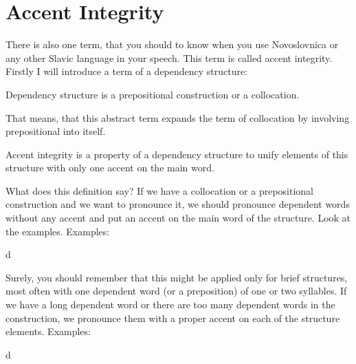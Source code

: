 \section{Accent Integrity}

There is also one term, that you should to know when you use Novoslovnica or any other Slavic language in your speech. This term is called accent integrity. Firstly I will introduce a term of a dependency structure:

Dependency structure is a prepositional construction or a collocation.

That means, that this abstract term expands the term of collocation by involving prepositional into itself. 

Accent integrity is a property of a dependency structure to unify elements of this structure with only one accent on the main word.

What does this definition say? If we have a collocation or a prepositional construction and we want to pronounce it, we should pronounce dependent words without any accent and put an accent on the main word of the structure. Look at the examples.
Examples:


d

Surely, you should remember that this might be applied only for brief structures, most often with one dependent word (or a preposition) of one or two syllables. If we have a long dependent word or there are too many dependent words in the construction, we pronounce them with a proper accent on each of the structure elements.
Examples:


d
